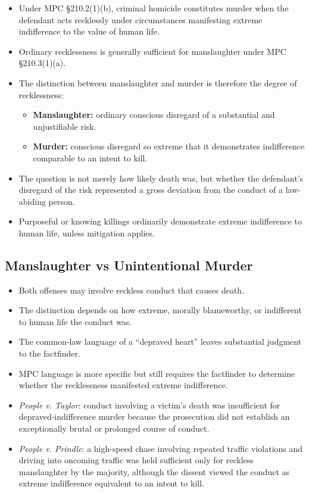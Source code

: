 \documentclass[11pt]{tex/lawoutline}
\begin{document}
{
\begin{itemize}
    \item Under MPC \S 210.2(1)(b), criminal homicide constitutes murder when the defendant acts recklessly under circumstances manifesting extreme indifference to the value of human life.
    \item Ordinary recklessness is generally sufficient for manslaughter under MPC \S 210.3(1)(a).
    \item The distinction between manslaughter and murder is therefore the degree of recklessness:
    \begin{itemize}
        \item \textbf{Manslaughter:} ordinary conscious disregard of a substantial and unjustifiable risk.
        \item \textbf{Murder:} conscious disregard so extreme that it demonstrates indifference comparable to an intent to kill.
    \end{itemize}
    \item The question is not merely how likely death was, but whether the defendant's disregard of the risk represented a gross deviation from the conduct of a law-abiding person.
    \item Purposeful or knowing killings ordinarily demonstrate extreme indifference to human life, unless mitigation applies.
\end{itemize}
}

\subsection{Manslaughter vs Unintentional Murder}
\begin{itemize}
    \item Both offenses may involve reckless conduct that causes death.
    \item The distinction depends on how extreme, morally blameworthy, or indifferent to human life the conduct was.
    \item The common-law language of a ``depraved heart'' leaves substantial judgment to the factfinder.
    \item MPC language is more specific but still requires the factfinder to determine whether the recklessness manifested extreme indifference.
    \item \textit{People v. Taylor}: conduct involving a victim's death was insufficient for depraved-indifference murder because the prosecution did not establish an exceptionally brutal or prolonged course of conduct.
    \item \textit{People v. Prindle}: a high-speed chase involving repeated traffic violations and driving into oncoming traffic was held sufficient only for reckless manslaughter by the majority, although the dissent viewed the conduct as extreme indifference equivalent to an intent to kill.
\end{itemize}
\end{document}

